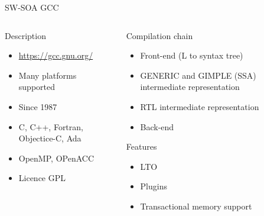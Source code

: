 %
\begin{Frame}{SW-SOA GCC}
  \begin{columns}[t]
    \begin{column}{4cm} %
      \begin{block}{Description}
        \begin{itemize}
        \item \href{https://gcc.gnu.org/}{https://gcc.gnu.org/}
        \item Many platforms supported 
        \item Since 1987
        \item C, C++, Fortran, Objectice-C, Ada
        \item OpenMP, OPenACC
        \item Licence GPL
        \end{itemize}
      \end{block} 
    \end{column}
    
    \begin{column}{6cm} %
      \begin{block}{Compilation chain}
        \begin{itemize}
        \item Front-end (L to syntax tree)
        \item GENERIC and GIMPLE (SSA) intermediate representation
        \item RTL intermediate representation
        \item Back-end
        \end{itemize}
      \end{block}   
        \begin{block}{Features}
          \begin{itemize}
          \item LTO
          \item Plugins
          \item Transactional memory support
          \end{itemize}
        \end{block}
    \end{column}
  \end{columns}  
\end{Frame}


